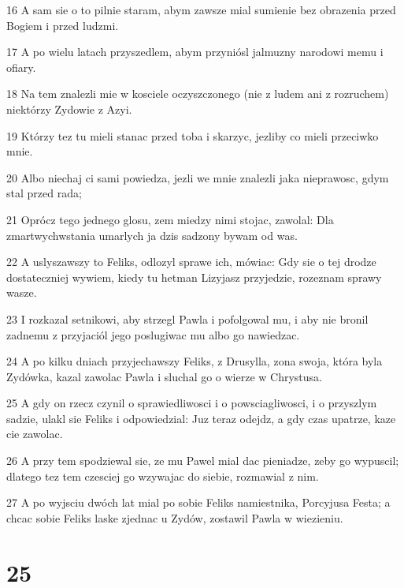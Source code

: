 \par 16 A sam sie o to pilnie staram, abym zawsze mial sumienie bez obrazenia przed Bogiem i przed ludzmi.
\par 17 A po wielu latach przyszedlem, abym przyniósl jalmuzny narodowi memu i ofiary.
\par 18 Na tem znalezli mie w kosciele oczyszczonego (nie z ludem ani z rozruchem) niektórzy Zydowie z Azyi.
\par 19 Którzy tez tu mieli stanac przed toba i skarzyc, jezliby co mieli przeciwko mnie.
\par 20 Albo niechaj ci sami powiedza, jezli we mnie znalezli jaka nieprawosc, gdym stal przed rada;
\par 21 Oprócz tego jednego glosu, zem miedzy nimi stojac, zawolal: Dla zmartwychwstania umarlych ja dzis sadzony bywam od was.
\par 22 A uslyszawszy to Feliks, odlozyl sprawe ich, mówiac: Gdy sie o tej drodze dostateczniej wywiem, kiedy tu hetman Lizyjasz przyjedzie, rozeznam sprawy wasze.
\par 23 I rozkazal setnikowi, aby strzegl Pawla i pofolgowal mu, i aby nie bronil zadnemu z przyjaciól jego poslugiwac mu albo go nawiedzac.
\par 24 A po kilku dniach przyjechawszy Feliks, z Drusylla, zona swoja, która byla Zydówka, kazal zawolac Pawla i sluchal go o wierze w Chrystusa.
\par 25 A gdy on rzecz czynil o sprawiedliwosci i o powsciagliwosci, i o przyszlym sadzie, ulakl sie Feliks i odpowiedzial: Juz teraz odejdz, a gdy czas upatrze, kaze cie zawolac.
\par 26 A przy tem spodziewal sie, ze mu Pawel mial dac pieniadze, zeby go wypuscil; dlatego tez tem czesciej go wzywajac do siebie, rozmawial z nim.
\par 27 A po wyjsciu dwóch lat mial po sobie Feliks namiestnika, Porcyjusa Festa; a chcac sobie Feliks laske zjednac u Zydów, zostawil Pawla w wiezieniu.

\chapter{25}

